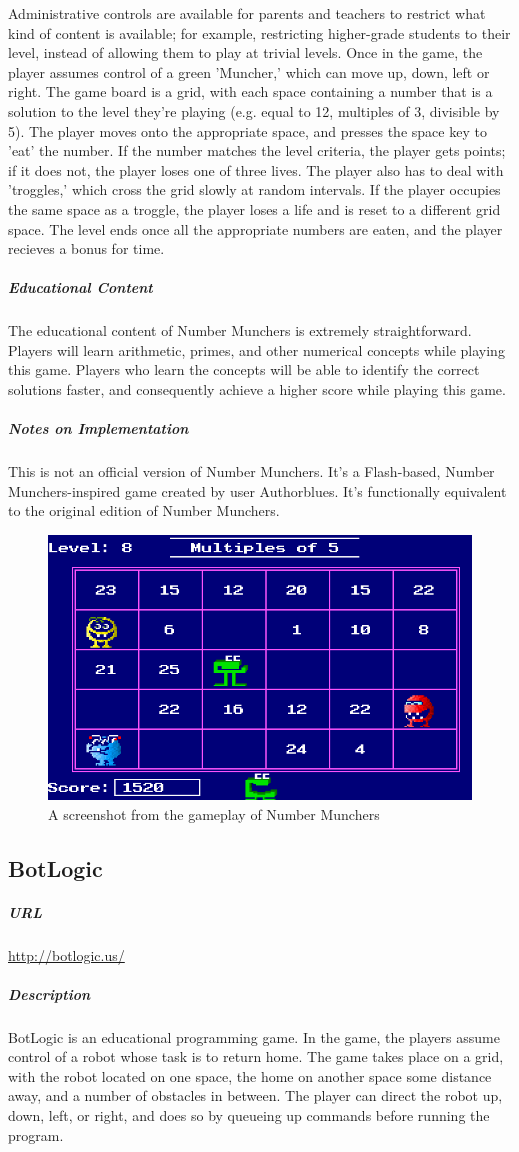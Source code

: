Administrative controls are available for parents and teachers to restrict what kind of content is available; for example, restricting higher-grade students to their level, instead of allowing them to play at trivial levels. Once in the game, the player assumes control of a green 'Muncher,' which can move up, down, left or right. The game board is a grid, with each space containing a number that is a solution to the level they're playing (e.g. equal to 12, multiples of 3, divisible by 5). The player moves onto the appropriate space, and presses the space key to 'eat' the number. If the number matches the level criteria, the player gets points; if it does not, the player loses one of three lives. The player also has to deal with 'troggles,' which cross the grid slowly at random intervals. If the player occupies the same space as a troggle, the player loses a life and is reset to a different grid space. The level ends once all the appropriate numbers are eaten, and the player recieves a bonus for time.\subparagraph{Educational Content}The educational content of Number Munchers is extremely straightforward. Players will learn arithmetic, primes, and other numerical concepts while playing this game. Players who learn the concepts will be able to identify the correct solutions faster, and consequently achieve a higher score while playing this game.\subparagraph{Notes on Implementation}This is not an official version of Number Munchers. It's a Flash-based, Number Munchers-inspired game created by user Authorblues. It's functionally equivalent to the original edition of Number Munchers.\begin{figure}[p]\centering \includegraphics[height=.4\textheight, width=\textwidth, keepaspectratio=true]{img/munchers_screen.png}\caption{A screenshot from the gameplay of Number Munchers}\end{figure}\subsection{BotLogic}\subparagraph{URL}\url{http://botlogic.us/}\subparagraph{Description}BotLogic is an educational programming game. In the game, the players assume control of a robot whose task is to return home. The game takes place on a grid, with the robot located on one space, the home on another space some distance away, and a number of obstacles in between. The player can direct the robot up, down, left, or right, and does so by queueing up commands before running the program. 